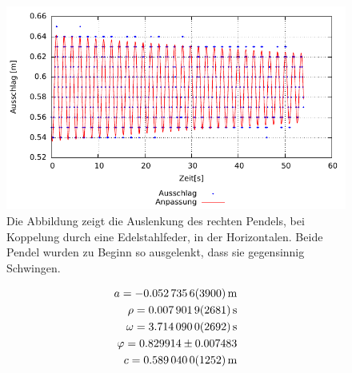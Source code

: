 \begin{figure}[h!]
	\centering
	\includegraphics[width=0.7\linewidth]{Auswertung/stahl/gegen/stahlgegA}
	\caption{Die Abbildung zeigt die Auslenkung des rechten Pendels, bei Koppelung durch eine Edelstahlfeder, in der Horizontalen. Beide Pendel wurden zu Beginn so ausgelenkt, dass sie gegensinnig Schwingen.}
	\label{fig:stahlgega}
\end{figure}

\begin{align*}
a               =\SI{ -0.0527356      \pm 0.00039  }{m}    \\
\rho               =\SI{ 0.0079019       \pm 0.0002681}{\per s}    \\
\omega               = \SI{3.71409         \pm 0.0002692}{\per s}    \\
\varphi               = 0.829914        \pm 0.007483    \\
c              = \SI{0.58904         \pm 0.0001252  }{m}  \\
\end{align*}






